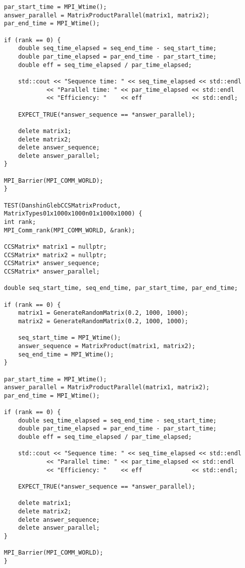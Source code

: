 \documentclass{report}
\begin{document}
\begin{lstlisting}
par_start_time = MPI_Wtime();
answer_parallel = MatrixProductParallel(matrix1, matrix2);
par_end_time = MPI_Wtime();

if (rank == 0) {
    double seq_time_elapsed = seq_end_time - seq_start_time;
    double par_time_elapsed = par_end_time - par_start_time;
    double eff = seq_time_elapsed / par_time_elapsed;

    std::cout << "Sequence time: " << seq_time_elapsed << std::endl
            << "Parallel time: " << par_time_elapsed << std::endl
            << "Efficiency: "    << eff              << std::endl;

    EXPECT_TRUE(*answer_sequence == *answer_parallel);

    delete matrix1;
    delete matrix2;
    delete answer_sequence;
    delete answer_parallel;
}

MPI_Barrier(MPI_COMM_WORLD);
}

TEST(DanshinGlebCCSMatrixProduct, MatrixTypes01x1000x1000n01x1000x1000) {
int rank;
MPI_Comm_rank(MPI_COMM_WORLD, &rank);

CCSMatrix* matrix1 = nullptr;
CCSMatrix* matrix2 = nullptr;
CCSMatrix* answer_sequence;
CCSMatrix* answer_parallel;

double seq_start_time, seq_end_time, par_start_time, par_end_time;

if (rank == 0) {
    matrix1 = GenerateRandomMatrix(0.2, 1000, 1000);
    matrix2 = GenerateRandomMatrix(0.2, 1000, 1000);

    seq_start_time = MPI_Wtime();
    answer_sequence = MatrixProduct(matrix1, matrix2);
    seq_end_time = MPI_Wtime();
}

par_start_time = MPI_Wtime();
answer_parallel = MatrixProductParallel(matrix1, matrix2);
par_end_time = MPI_Wtime();

if (rank == 0) {
    double seq_time_elapsed = seq_end_time - seq_start_time;
    double par_time_elapsed = par_end_time - par_start_time;
    double eff = seq_time_elapsed / par_time_elapsed;

    std::cout << "Sequence time: " << seq_time_elapsed << std::endl
            << "Parallel time: " << par_time_elapsed << std::endl
            << "Efficiency: "    << eff              << std::endl;

    EXPECT_TRUE(*answer_sequence == *answer_parallel);

    delete matrix1;
    delete matrix2;
    delete answer_sequence;
    delete answer_parallel;
}

MPI_Barrier(MPI_COMM_WORLD);
}


\end{lstlisting}
\end{document}
